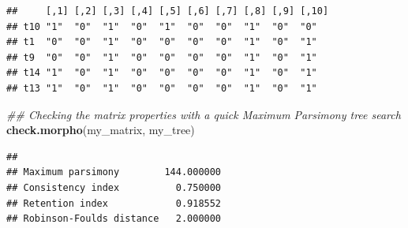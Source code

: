 \documentclass[]{book}
\newenvironment{Shaded}{\begin{snugshade}}{\end{snugshade}}
\newcommand{\CommentTok}[1]{\textcolor[rgb]{0.56,0.35,0.01}{\textit{#1}}}
\newcommand{\DataTypeTok}[1]{\textcolor[rgb]{0.13,0.29,0.53}{#1}}
\newcommand{\DecValTok}[1]{\textcolor[rgb]{0.00,0.00,0.81}{#1}}
\newcommand{\FloatTok}[1]{\textcolor[rgb]{0.00,0.00,0.81}{#1}}
\newcommand{\KeywordTok}[1]{\textcolor[rgb]{0.13,0.29,0.53}{\textbf{#1}}}
\newcommand{\NormalTok}[1]{#1}
\newcommand{\OperatorTok}[1]{\textcolor[rgb]{0.81,0.36,0.00}{\textbf{#1}}}
\newcommand{\OtherTok}[1]{\textcolor[rgb]{0.56,0.35,0.01}{#1}}
\newcommand{\StringTok}[1]{\textcolor[rgb]{0.31,0.60,0.02}{#1}}
\begin{document}
\begin{Shaded}
\end{Shaded}

\begin{verbatim}
##     [,1] [,2] [,3] [,4] [,5] [,6] [,7] [,8] [,9] [,10]
## t10 "1"  "0"  "1"  "0"  "1"  "0"  "0"  "1"  "0"  "0"  
## t1  "0"  "0"  "1"  "0"  "0"  "0"  "0"  "1"  "0"  "1"  
## t9  "0"  "0"  "1"  "0"  "0"  "0"  "0"  "1"  "0"  "1"  
## t14 "1"  "0"  "1"  "0"  "0"  "0"  "0"  "1"  "0"  "1"  
## t13 "1"  "0"  "1"  "0"  "0"  "0"  "0"  "1"  "0"  "1"
\end{verbatim}

\begin{Shaded}
\begin{Highlighting}[]
\CommentTok{## Checking the matrix properties with a quick Maximum Parsimony tree search}
\KeywordTok{check.morpho}\NormalTok{(my_matrix, my_tree)}
\end{Highlighting}
\end{Shaded}

\begin{verbatim}
##                                    
## Maximum parsimony        144.000000
## Consistency index          0.750000
## Retention index            0.918552
## Robinson-Foulds distance   2.000000
\end{verbatim}
\end{document}
